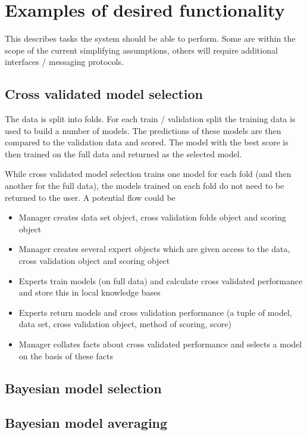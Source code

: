 \documentclass[twoside,11pt]{article}
\begin{document}
\section{Examples of desired functionality}

This describes tasks the system should be able to perform.
Some are within the scope of the current simplifying assumptions, others will require additional interfaces / messaging protocols.

\subsection{Cross validated model selection}

The data is split into folds.
For each train / validation split the training data is used to build a number of models.
The predictions of these models are then compared to the validation data and scored.
The model with the best score is then trained on the full data and returned as the selected model.

While cross validated model selection trains one model for each fold (and then another for the full data), the models trained on each fold do not need to be returned to the user.
A potential flow could be
\begin{itemize}
  \item Manager creates data set object, cross validation folds object and scoring object
  \item Manager creates several expert objects which are given access to the data, cross validation object and scoring object
  \item Experts train models (on full data) and calculate cross validated performance and store this in local knowledge bases
  \item Experts return models and cross validation performance (a tuple of model, data set, cross validation object, method of scoring, score)
  \item Manager collates facts about cross validated performance and selects a model on the basis of these facts
\end{itemize}

\subsection{Bayesian model selection}

\subsection{Bayesian model averaging}
\end{document}
